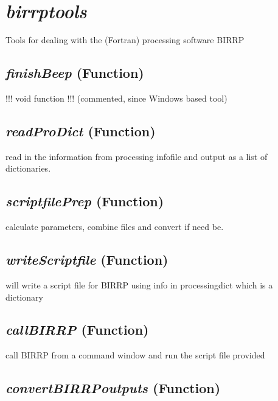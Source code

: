 \section{\textit{birrptools} }
\label{sec:processing.birrptools}

Tools for dealing with the (Fortran) processing software BIRRP 

\subsection{\textit{finishBeep} (Function)}
\label{ssec:processing.birrptools.finishBeep}

!!! void function !!! 
(commented, since Windows based tool)

\subsection{\textit{readProDict} (Function)}
\label{ssec:processing.birrptools.readProDict}

read in the information from processing infofile and output
    as a list of dictionaries.


\subsection{\textit{scriptfilePrep} (Function)}
\label{ssec:processing.birrptools.scriptfilePrep}

calculate parameters, combine files and 
    convert if need be.

\subsection{\textit{writeScriptfile} (Function)}
\label{ssec:processing.birrptools.writeScriptfile}

will write a script file for BIRRP using 
    info in processingdict which is a dictionary

\subsection{\textit{callBIRRP} (Function)}
\label{ssec:processing.birrptools.callBIRRP}

call BIRRP from a command window and 
    run the script file provided

\subsection{\textit{convertBIRRPoutputs} (Function)}
\label{ssec:processing.birrptools.convertBIRRPoutputs}

